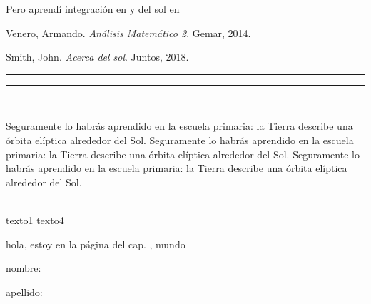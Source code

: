 \documentclass{report}
\begin{document}
Pero aprendí integración en \cite{ven14} y del sol en \cite[cap. 5]{smi18}

\begin{thebibliography}{99}
 Venero, Armando. \emph{Análisis Matemático 2}. Gemar, 2014.

 Smith, John. \emph{Acerca del sol}. Juntos, 2018.
\end{thebibliography}

\rule{5cm}{1mm}

\rule{2cm}{2cm}


\setlength{\fboxrule}{1mm}


\setlength{\fboxsep}{6mm}


\setlength{\fboxrule}{0.4pt}
\setlength{\fboxsep}{3pt}


\ \\[1cm]

\begin{minipage}{7cm}
Seguramente lo habrás aprendido en la escuela primaria: la Tierra describe una órbita elíptica alrededor del Sol. Seguramente lo habrás aprendido en la escuela primaria: la Tierra describe una órbita elíptica alrededor del Sol. Seguramente lo habrás aprendido en la escuela primaria: la Tierra describe una órbita elíptica alrededor del Sol.	
\end{minipage}

\ \\[1cm]

texto1   texto4

\vfill

hola, estoy en la página  del cap. , \thepage \hfill mundo

nombre:\hrulefill

apellido:\dotfill

\newpage
\end{document}
